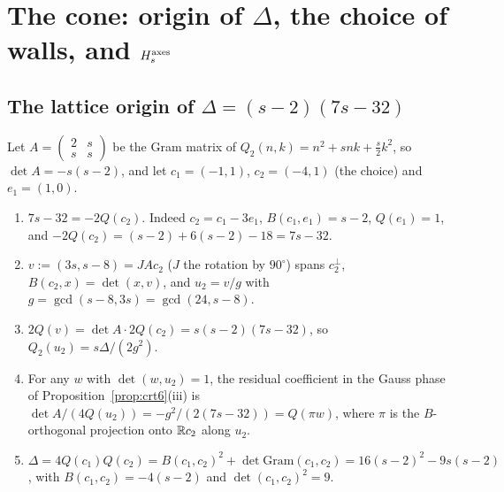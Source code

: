 \section{The cone: origin of $\Delta$, the choice of walls, and $H_s^{\rm axes}$}\label{sec:cone}
\subsection{The lattice origin of $\Delta=(s-2)(7s-32)$}\label{sec:delta}
Let $A=\left(\begin{smallmatrix}2&s\\s&s\end{smallmatrix}\right)$ be the Gram matrix of $Q_2(n,k)=n^2+snk+\tfrac s2k^2$, so $\det A=-s(s-2)$, and let $c_1=(-1,1)$, $c_2=(-4,1)$ (the choice) and $e_1=(1,0)$.
\begin{proposition}\label{prop:delta7}
\begin{enumerate}[label=(\roman*)]
\item $7s-32=-2Q(c_2)$. Indeed $c_2=c_1-3e_1$, $B(c_1,e_1)=s-2$, $Q(e_1)=1$, and $-2Q(c_2)=(s-2)+6(s-2)-18=7s-32$.
\item $v:=(3s,s-8)=JAc_2$ ($J$ the rotation by $90^\circ$) spans $c_2^\perp$, $B(c_2,x)=\det(x,v)$, and $u_2=v/g$ with $g=\gcd(s-8,3s)=\gcd(24,s-8)$.
\item $2Q(v)=\det A\cdot2Q(c_2)=s(s-2)(7s-32)$, so $Q_2(u_2)=s\Delta/(2g^2)$.
\item For any $w$ with $\det(w,u_2)=1$, the residual coefficient in the Gauss phase of Proposition~\ref{prop:crt6}(iii) is $\det A/(4Q(u_2))=-g^2/(2(7s-32))=Q(\pi w)$, where $\pi$ is the $B$-orthogonal projection onto $\mathbb{R} c_2$ along $u_2$.
\item $\Delta=4Q(c_1)Q(c_2)=B(c_1,c_2)^2+\det\mathrm{Gram}(c_1,c_2)=16(s-2)^2-9s(s-2)$, with $B(c_1,c_2)=-4(s-2)$ and $\det(c_1,c_2)^2=9$.
\end{enumerate}
\end{proposition}

